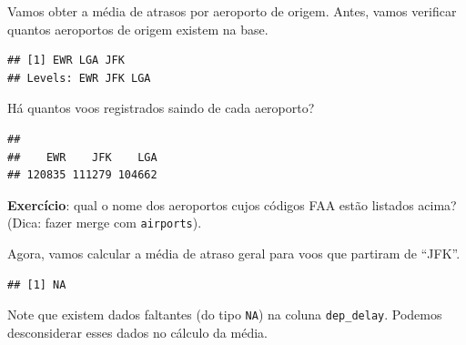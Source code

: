 \documentclass[
]{book}
\newenvironment{Shaded}{\begin{snugshade}}{\end{snugshade}}
\newcommand{\AttributeTok}[1]{\textcolor[rgb]{0.13,0.29,0.53}{#1}}
\newcommand{\ConstantTok}[1]{\textcolor[rgb]{0.56,0.35,0.01}{#1}}
\newcommand{\FunctionTok}[1]{\textcolor[rgb]{0.13,0.29,0.53}{\textbf{#1}}}
\newcommand{\NormalTok}[1]{#1}
\newcommand{\SpecialCharTok}[1]{\textcolor[rgb]{0.81,0.36,0.00}{\textbf{#1}}}
\newcommand{\StringTok}[1]{\textcolor[rgb]{0.31,0.60,0.02}{#1}}
\begin{document}
Vamos obter a média de atrasos por aeroporto de origem.
Antes, vamos verificar quantos aeroportos de origem existem na base.

\begin{Shaded}
\end{Shaded}

\begin{verbatim}
## [1] EWR LGA JFK
## Levels: EWR JFK LGA
\end{verbatim}

Há quantos voos registrados saindo de cada aeroporto?

\begin{Shaded}
\end{Shaded}

\begin{verbatim}
## 
##    EWR    JFK    LGA 
## 120835 111279 104662
\end{verbatim}

\textbf{Exercício}: qual o nome dos aeroportos cujos códigos FAA estão listados acima? (Dica: fazer merge com \texttt{airports}).

Agora, vamos calcular a média de atraso geral para voos que partiram de ``JFK''.

\begin{Shaded}
\end{Shaded}

\begin{verbatim}
## [1] NA
\end{verbatim}

Note que existem dados faltantes (do tipo \texttt{NA}) na coluna \texttt{dep\_delay}.
Podemos desconsiderar esses dados no cálculo da média.

\begin{Shaded}
\end{Shaded}
\end{document}
